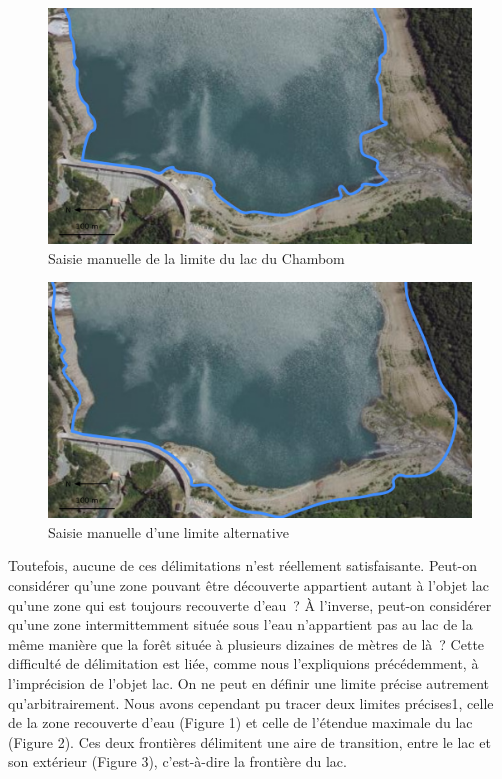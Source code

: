 \begin{figure}
  \centering
  \includegraphics{../figures/fig1.png}
  \caption{Saisie manuelle de la limite du lac du Chambom}
  \label{fig:lim_champ}
\end{figure}

\begin{figure}
  \centering
  \includegraphics{../figures/fig2.png}
  \caption{Saisie manuelle d'une limite alternative}
  \label{fig:lim_champ_alt}
\end{figure}

Toutefois, aucune de ces délimitations n’est réellement
satisfaisante. Peut-on considérer qu’une zone pouvant être découverte
appartient autant à l’objet lac qu’une zone qui est toujours
recouverte d’eau ? À l’inverse, peut-on considérer qu’une zone
intermittemment située sous l’eau n’appartient pas au lac de la même
manière que la forêt située à plusieurs dizaines de mètres de là ?
Cette difficulté de délimitation est liée, comme nous l’expliquions
précédemment, à l’imprécision de l’objet lac. On ne peut en définir
une limite précise autrement qu’arbitrairement. Nous avons cependant
pu tracer deux limites précises1, celle de la zone recouverte d’eau
(Figure 1) et celle de l’étendue maximale du lac (Figure 2). Ces deux
frontières délimitent une aire de transition, entre le lac et son
extérieur (Figure 3), c’est-à-dire la frontière du lac.

